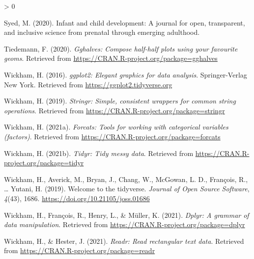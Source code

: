 \documentclass[
  english,
  man,floatsintext]{apa6}
\newlength{\cslhangindent}
\newenvironment{CSLReferences}[2] %
 {%
  \setlength{\parindent}{0pt}
  \ifodd #1 \everypar{\setlength{\hangindent}{\cslhangindent}}\ignorespaces\fi
  \ifnum #2 > 0
  \setlength{\parskip}{#2\baselineskip}
  \fi
 }%
 {}
\begin{document}
\begin{CSLReferences}{1}{0}
\leavevmode\hypertarget{ref-syed2020infant}{}%
Syed, M. (2020). Infant and child development: A journal for open, transparent, and inclusive science from prenatal through emerging adulthood.

\leavevmode\hypertarget{ref-R-gghalves}{}%
Tiedemann, F. (2020). \emph{Gghalves: Compose half-half plots using your favourite geoms}. Retrieved from \url{https://CRAN.R-project.org/package=gghalves}

\leavevmode\hypertarget{ref-R-ggplot2}{}%
Wickham, H. (2016). \emph{ggplot2: Elegant graphics for data analysis}. Springer-Verlag New York. Retrieved from \url{https://ggplot2.tidyverse.org}

\leavevmode\hypertarget{ref-R-stringr}{}%
Wickham, H. (2019). \emph{Stringr: Simple, consistent wrappers for common string operations}. Retrieved from \url{https://CRAN.R-project.org/package=stringr}

\leavevmode\hypertarget{ref-R-forcats}{}%
Wickham, H. (2021a). \emph{Forcats: Tools for working with categorical variables (factors)}. Retrieved from \url{https://CRAN.R-project.org/package=forcats}

\leavevmode\hypertarget{ref-R-tidyr}{}%
Wickham, H. (2021b). \emph{Tidyr: Tidy messy data}. Retrieved from \url{https://CRAN.R-project.org/package=tidyr}

\leavevmode\hypertarget{ref-R-tidyverse}{}%
Wickham, H., Averick, M., Bryan, J., Chang, W., McGowan, L. D., François, R., \ldots{} Yutani, H. (2019). Welcome to the {tidyverse}. \emph{Journal of Open Source Software}, \emph{4}(43), 1686. \url{https://doi.org/10.21105/joss.01686}

\leavevmode\hypertarget{ref-R-dplyr}{}%
Wickham, H., François, R., Henry, L., \& Müller, K. (2021). \emph{Dplyr: A grammar of data manipulation}. Retrieved from \url{https://CRAN.R-project.org/package=dplyr}

\leavevmode\hypertarget{ref-R-readr}{}%
Wickham, H., \& Hester, J. (2021). \emph{Readr: Read rectangular text data}. Retrieved from \url{https://CRAN.R-project.org/package=readr}

\end{CSLReferences}

\endgroup
\end{document}
